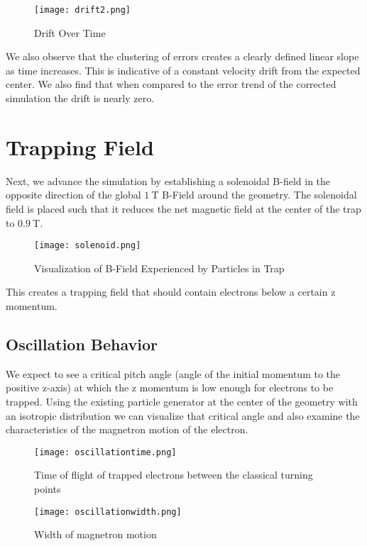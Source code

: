 \documentclass[12pt,letterpaper]{article}
\begin{document}
    \begin{figure}[H]
    \centering
    \texttt{[image: drift2.png]}
    \caption{Drift Over Time}
    \end{figure}

We also observe that the clustering of errors creates a clearly defined linear slope as time increases. This is indicative of a constant velocity drift from the expected center. We also find that when compared to the error trend of the corrected simulation the drift is nearly zero. 

\section{Trapping Field}

Next, we advance the simulation by establishing a solenoidal B-field in the opposite direction of the global $1~$T B-Field around the geometry. The solenoidal field is placed such that it reduces the net magnetic field at the center of the trap to $0.9~$T. 

    \begin{figure}[H]
    \centering
    \texttt{[image: solenoid.png]}
    \caption{Visualization of B-Field Experienced by Particles in Trap}
    \end{figure}

This creates a trapping field that should contain electrons below a certain z momentum.

\subsection{Oscillation Behavior}

We expect to see a critical pitch angle (angle of the initial momentum to the positive z-axis) at which the z momentum is low enough for electrons to be trapped. Using the existing particle generator at the center of the geometry with an isotropic distribution we can visualize that critical angle and also examine the characteristics of the magnetron motion of the electron. 

    \begin{figure}[H]
    \centering
    \texttt{[image: oscillationtime.png]}
    \caption{Time of flight of trapped electrons between the classical turning points}
    \end{figure}
    
    \begin{figure}[H]
    \centering
    \texttt{[image: oscillationwidth.png]}
    \caption{Width of magnetron motion}
    \end{figure}
\end{document}

